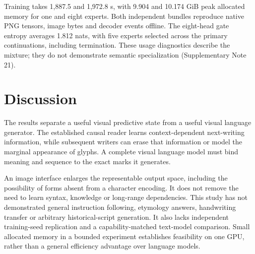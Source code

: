 Training takes 1,887.5 and 1,972.8 s, with 9.904 and 10.174 GiB peak allocated
memory for one and eight experts. Both independent bundles reproduce native
PNG tensors, image bytes and decoder events offline. The eight-head gate
entropy averages 1.812 nats, with five experts selected across the primary
continuations, including termination. These usage diagnostics describe the
mixture; they do not demonstrate semantic specialization (Supplementary
Note 21).


\section*{Discussion}
The results separate a useful visual predictive state from a useful visual
language generator. The established causal reader learns context-dependent
next-writing information, while subsequent writers can erase that information
or model the marginal appearance of glyphs. A complete visual language model
must bind meaning and sequence to the exact marks it generates.

An image interface enlarges the representable output space, including the
possibility of forms absent from a character encoding. It does not remove the
need to learn syntax, knowledge or long-range dependencies. This study has not
demonstrated general instruction following, etymology answers, handwriting
transfer or arbitrary historical-script generation. It also lacks independent
training-seed replication and a capability-matched text-model comparison.
Small allocated memory in a bounded experiment establishes feasibility on one
GPU, rather than a general efficiency advantage over language models.

